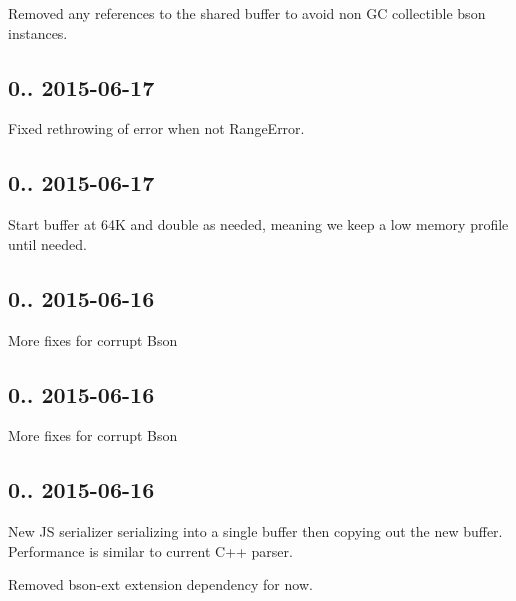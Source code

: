 \begin{DoxyItemize}
\item Removed any references to the shared buffer to avoid non GC collectible bson instances.
\end{DoxyItemize}

\subsection*{0.. 2015-\/06-\/17 }


\begin{DoxyItemize}
\item Fixed rethrowing of error when not Range\+Error.
\end{DoxyItemize}

\subsection*{0.. 2015-\/06-\/17 }


\begin{DoxyItemize}
\item Start buffer at 64K and double as needed, meaning we keep a low memory profile until needed.
\end{DoxyItemize}

\subsection*{0.. 2015-\/06-\/16 }


\begin{DoxyItemize}
\item More fixes for corrupt Bson
\end{DoxyItemize}

\subsection*{0.. 2015-\/06-\/16 }


\begin{DoxyItemize}
\item More fixes for corrupt Bson
\end{DoxyItemize}

\subsection*{0.. 2015-\/06-\/16 }


\begin{DoxyItemize}
\item New JS serializer serializing into a single buffer then copying out the new buffer. Performance is similar to current C++ parser.
\item Removed bson-\/ext extension dependency for now.
\end{DoxyItemize}

